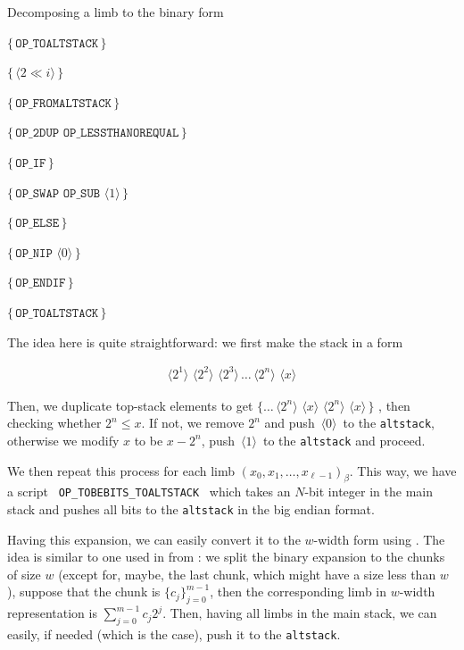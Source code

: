 \documentclass{iacrtrans}
\newcommand{\elem}[1]{\, \langle #1 \rangle \,}
\newcommand{\opcode}[1]{\, \texttt{#1} \,}
\newcommand{\script}[1]{ $\big\{ #1 \big\}$ }
\begin{document}
\begin{algorithm}
\caption{Decomposing a limb to the binary form}\label{alg:script_to_binary_form}

\script{\opcode{OP\_TOALTSTACK}} 

 {
    \script{\elem{2 \ll i}} 
}

\script{\opcode{OP\_FROMALTSTACK}} 

 {
    \script{\opcode{OP\_2DUP} \opcode{OP\_LESSTHANOREQUAL}}
    
    \script{\opcode{OP\_IF}}
    
        \hspace{10px}\script{\opcode{OP\_SWAP} \opcode{OP\_SUB} \elem{1}}
    
    \script{\opcode{OP\_ELSE}}
    
        \hspace{10px}\script{\opcode{OP\_NIP} \elem{0}}
    
    \script{\opcode{OP\_ENDIF}}
    
    \script{\opcode{OP\_TOALTSTACK}}
}
\end{algorithm}

The idea here is quite straightforward: we first make the stack in a form
\begin{empheqboxed}
\begin{align*}
    \elem{2^1} \elem{2^2} \elem{2^3} \dots \elem{2^n} \elem{x}
\end{align*}
\end{empheqboxed}

Then, we duplicate top-stack elements to get \script{\dots \elem{2^n} \elem{x} \elem{2^n} \elem{x}}, then checking whether $2^n \leq x$. If not, we remove $2^n$ and push $\elem{0}$ to the \texttt{altstack}, otherwise we modify $x$ to be $x - 2^n$, push $\elem{1}$ to the \texttt{altstack} and proceed. 

We then repeat this process for each limb $(x_0,x_1,\dots,x_{\ell-1})_{\beta}$. This way, we have a script \opcode{OP\_TOBEBITS\_TOALTSTACK} which takes an $N$-bit integer in the main stack and pushes all bits to the \texttt{altstack} in the big endian format.

Having this expansion, we can easily convert it to the $w$-width form using . The idea is similar to one used in  from : we split the binary expansion to the chunks of size $w$ (except for, maybe, the last chunk, which might have a size less than $w$), suppose that the chunk is $\{c_j\}_{j=0}^{m-1}$, then the corresponding limb in $w$-width representation is $\sum_{j=0}^{m-1}c_j2^j$. Then, having all limbs in the main stack, we can easily, if needed (which is the case), push it to the \texttt{altstack}. 
\end{document}

